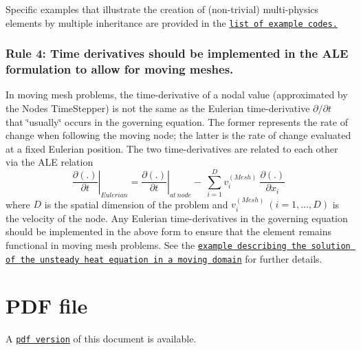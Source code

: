 Specific examples that illustrate the creation of (non-\/trivial) multi-\/physics elements by multiple inheritance are provided in the \href{../../example_code_list/html/index.html#multi}{\tt list of example codes.}\hypertarget{index_mesh_movement}{}\subsubsection{Rule 4\+: Time derivatives should be implemented in the A\+L\+E formulation to allow for moving meshes.}\label{index_mesh_movement}
In moving mesh problems, the time-\/derivative of a nodal value (approximated by the Node\textquotesingle{}s {\ttfamily Time\+Stepper}) is not the same as the Eulerian time-\/derivative $ \partial/ \partial t $ that \char`\"{}usually\char`\"{} occurs in the governing equation. The former represents the rate of change when following the moving node; the latter is the rate of change evaluated at a fixed Eulerian position. The two time-\/derivatives are related to each other via the A\+LE relation \[ \left. \frac{\partial (.)}{\partial t} \right|_{Eulerian} = \left. \frac{\partial (.) }{\partial t} \right|_{at \ node} - \ \sum_{i=1}^D v_i^{(Mesh)} \ \frac{\partial (.) }{ \partial x_i} \] where $ D $ is the spatial dimension of the problem and $ v_i^{(Mesh)} \ (i=1,...,D) $ is the velocity of the node. Any Eulerian time-\/derivatives in the governing equation should be implemented in the above form to ensure that the element remains functional in moving mesh problems. See the \href{../../unsteady_heat/two_d_unsteady_heat_ALE/html/index.html}{\tt example describing the solution of the unsteady heat equation in a moving domain} for further details.



 

 \hypertarget{index_pdf}{}\section{P\+D\+F file}\label{index_pdf}
A \href{../latex/refman.pdf}{\tt pdf version} of this document is available. 
